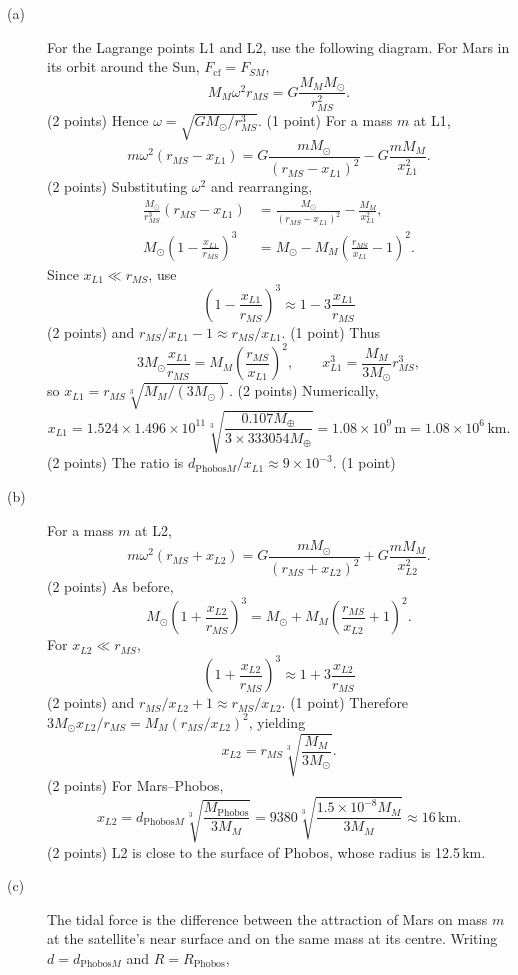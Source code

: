 \begin{description}
\item[(a)] For the Lagrange points L1 and L2, use the following diagram.
For Mars in its orbit around the Sun, $F_{\mathrm{cf}}=F_{SM}$,
\[
M_M\omega^2r_{MS}=G\frac{M_MM_\odot}{r_{MS}^2}.
\]\hfill(2 points)
Hence $\omega=\sqrt{GM_\odot/r_{MS}^3}$. \hfill(1 point)
For a mass $m$ at L1,
\[
m\omega^2(r_{MS}-x_{L1})=G\frac{mM_\odot}{(r_{MS}-x_{L1})^2}-G\frac{mM_M}{x_{L1}^2}.
\]\hfill(2 points)
Substituting $\omega^2$ and rearranging,
\begin{align*}
\frac{M_\odot}{r_{MS}^3}(r_{MS}-x_{L1})&=\frac{M_\odot}{(r_{MS}-x_{L1})^2}-\frac{M_M}{x_{L1}^2},\\
M_\odot\left(1-\frac{x_{L1}}{r_{MS}}\right)^3&=M_\odot-M_M\left(\frac{r_{MS}}{x_{L1}}-1\right)^2.
\end{align*}
Since $x_{L1}\ll r_{MS}$, use
\[
\left(1-\frac{x_{L1}}{r_{MS}}\right)^3\approx1-3\frac{x_{L1}}{r_{MS}}
\]\hfill(2 points)
and $r_{MS}/x_{L1}-1\approx r_{MS}/x_{L1}$. \hfill(1 point)
Thus
\[
3M_\odot\frac{x_{L1}}{r_{MS}}=M_M\left(\frac{r_{MS}}{x_{L1}}\right)^2,\qquad
x_{L1}^3=\frac{M_M}{3M_\odot}r_{MS}^3,
\]
so $x_{L1}=r_{MS}\sqrt[3]{M_M/(3M_\odot)}$. \hfill(2 points)
Numerically,
\[
x_{L1}=1.524\times1.496\times10^{11}\sqrt[3]{\frac{0.107M_\oplus}{3\times333054M_\oplus}}
=1.08\times10^9\,\mathrm m=1.08\times10^6\,\mathrm{km}.
\]\hfill(2 points)
The ratio is $d_{\mathrm{Phobos}M}/x_{L1}\approx9\times10^{-3}$. \hfill(1 point)
\item[(b)] For a mass $m$ at L2,
\[
m\omega^2(r_{MS}+x_{L2})=G\frac{mM_\odot}{(r_{MS}+x_{L2})^2}+G\frac{mM_M}{x_{L2}^2}.
\]\hfill(2 points)
As before,
\[
M_\odot\left(1+\frac{x_{L2}}{r_{MS}}\right)^3=M_\odot+M_M\left(\frac{r_{MS}}{x_{L2}}+1\right)^2.
\]
For $x_{L2}\ll r_{MS}$,
\[
\left(1+\frac{x_{L2}}{r_{MS}}\right)^3\approx1+3\frac{x_{L2}}{r_{MS}}
\]\hfill(2 points)
and $r_{MS}/x_{L2}+1\approx r_{MS}/x_{L2}$. \hfill(1 point)
Therefore $3M_\odot x_{L2}/r_{MS}=M_M(r_{MS}/x_{L2})^2$, yielding
\[
x_{L2}=r_{MS}\sqrt[3]{\frac{M_M}{3M_\odot}}.
\]\hfill(2 points)
For Mars--Phobos,
\[
x_{L2}=d_{\mathrm{Phobos}M}\sqrt[3]{\frac{M_{\mathrm{Phobos}}}{3M_M}}
=9380\sqrt[3]{\frac{1.5\times10^{-8}M_M}{3M_M}}\approx16\,\mathrm{km}.
\]\hfill(2 points)
L2 is close to the surface of Phobos, whose radius is 12.5\,km.
\item[(c)]
The tidal force is the difference between the attraction of Mars on mass $m$ at the satellite's near surface and on the same mass at its centre. Writing $d=d_{\mathrm{Phobos}M}$ and $R=R_{\mathrm{Phobos}}$,

\end{description}

